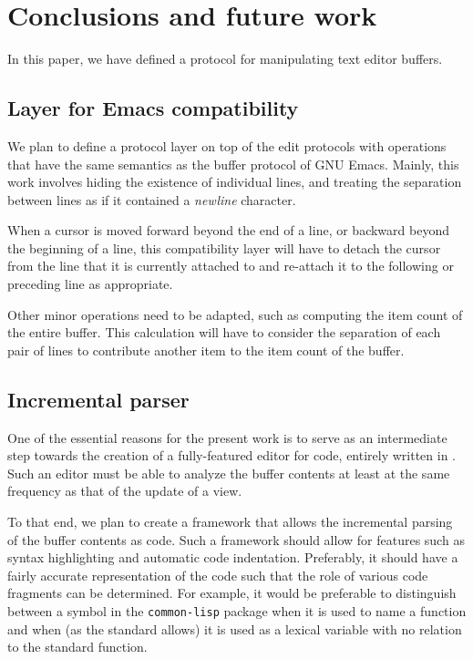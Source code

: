 \section{Conclusions and future work}

In this paper, we have defined a \clos{} protocol for manipulating
text editor buffers.

\subsection{Layer for Emacs compatibility}

We plan to define a protocol layer on top of the edit protocols with
operations that have the same semantics as the buffer protocol of GNU
Emacs.  Mainly, this work involves hiding the existence of individual
lines, and treating the separation between lines as if it contained a
\emph{newline} character.

When a cursor is moved forward beyond the end of a line, or backward
beyond the beginning of a line, this compatibility layer will have to
detach the cursor from the line that it is currently attached to and
re-attach it to the following or preceding line as appropriate.

Other minor operations need to be adapted, such as computing the item
count of the entire buffer.  This calculation will have to consider
the separation of each pair of lines to contribute another item to the
item count of the buffer.

\subsection{Incremental \commonlisp{} parser}

One of the essential reasons for the present work is to serve as an
intermediate step towards the creation of a fully-featured editor for
\commonlisp{} code, entirely written in \commonlisp{}.  Such an editor
must be able to analyze the buffer contents at least at the same
frequency as that of the update of a view.

To that end, we plan to create a framework that allows the incremental
parsing of the buffer contents as \commonlisp{} code.  Such a
framework should allow for features such as syntax highlighting and
automatic code indentation.  Preferably, it should have a fairly
accurate representation of the code such that the role of various code
fragments can be determined.  For example, it would be preferable to
distinguish between a symbol in the \texttt{common-lisp} package when
it is used to name a \commonlisp{} function and when (as the
\commonlisp{} standard allows) it is used as a lexical variable with
no relation to the standard function.

